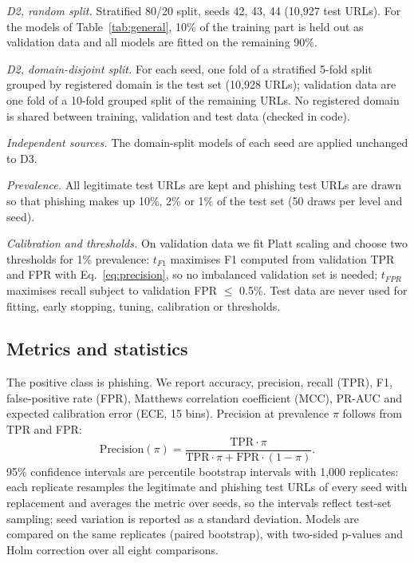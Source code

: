 \documentclass[conference]{IEEEtran}
\begin{document}
\emph{D2, random split.} Stratified 80/20 split, seeds 42, 43, 44 (10,927 test URLs). For the models of Table~\ref{tab:general}, 10\% of the training part is held out as validation data and all models are fitted on the remaining 90\%.

\emph{D2, domain-disjoint split.} For each seed, one fold of a stratified 5-fold split grouped by registered domain is the test set (10,928 URLs); validation data are one fold of a 10-fold grouped split of the remaining URLs. No registered domain is shared between training, validation and test data (checked in code).

\emph{Independent sources.} The domain-split models of each seed are applied unchanged to D3.

\emph{Prevalence.} All legitimate test URLs are kept and phishing test URLs are drawn so that phishing makes up 10\%, 2\% or 1\% of the test set (50 draws per level and seed).

\emph{Calibration and thresholds.} On validation data we fit Platt scaling \cite{platt1999} and choose two thresholds for 1\% prevalence: $t_{F1}$ maximises F1 computed from validation TPR and FPR with Eq.~\eqref{eq:precision}, so no imbalanced validation set is needed; $t_{FPR}$ maximises recall subject to validation FPR $\le$ 0.5\%. Test data are never used for fitting, early stopping, tuning, calibration or thresholds.

\subsection{Metrics and statistics}

The positive class is phishing. We report accuracy, precision, recall (TPR), F1, false-positive rate (FPR), Matthews correlation coefficient (MCC), PR-AUC and expected calibration error (ECE, 15 bins). Precision at prevalence $\pi$ follows from TPR and FPR:
\begin{equation}
\text{Precision}(\pi) = \frac{\text{TPR}\cdot\pi}{\text{TPR}\cdot\pi + \text{FPR}\cdot(1-\pi)}.
\label{eq:precision}
\end{equation}
95\% confidence intervals are percentile bootstrap intervals \cite{efron1993} with 1,000 replicates: each replicate resamples the legitimate and phishing test URLs of every seed with replacement and averages the metric over seeds, so the intervals reflect test-set sampling; seed variation is reported as a standard deviation. Models are compared on the same replicates (paired bootstrap), with two-sided p-values and Holm correction \cite{holm1979} over all eight comparisons.
\end{document}
